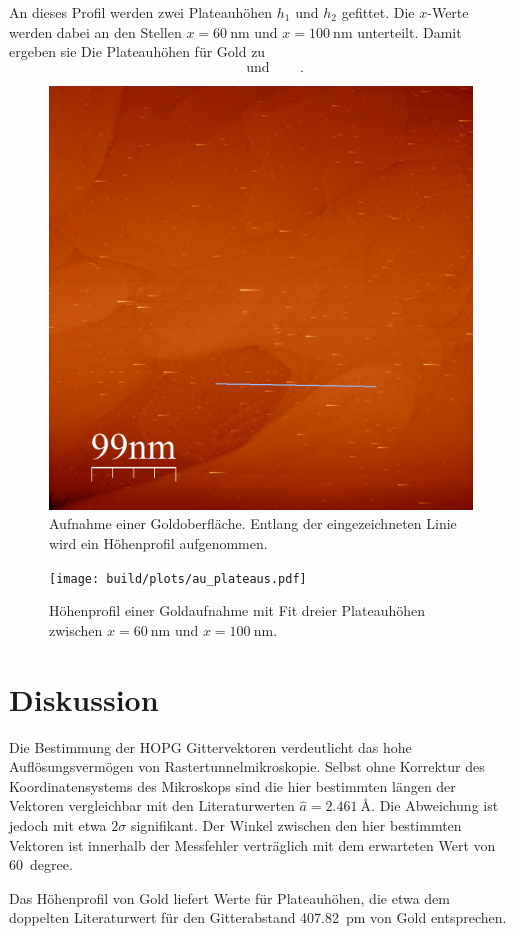 An dieses Profil werden zwei Plateauhöhen $h_1$ und $h_2$ gefittet. Die
$x$-Werte werden dabei an den Stellen $x = \SI{60}{\nano\meter}$ und $x =
\SI{100}{\nano\meter}$ unterteilt.  Damit ergeben sie Die Plateauhöhen für Gold
zu
\begin{equation*}
    \qquad\text{und}\qquad\,.
\end{equation*}
\begin{figure}
    \centering
    \includegraphics[width=0.9\linewidth]{raw/AU-1-View-2.png}
    \caption{
        Aufnahme einer Goldoberfläche. Entlang der eingezeichneten Linie
    wird ein Höhenprofil aufgenommen.
    }
    \label{fig:gold}
\end{figure}
\begin{figure}
    \centering
    \texttt{[image: build/plots/au\_plateaus.pdf]}
    \caption{
        Höhenprofil einer Goldaufnahme mit Fit dreier Plateauhöhen zwischen $x
        = \SI{60}{\nano\meter}$ und $x = \SI{100}{\nano\meter}$.
    }
    \label{fig:gold-fit}
\end{figure}

\section{Diskussion}
\label{sec:diskussion}
Die Bestimmung der HOPG Gittervektoren verdeutlicht das hohe
Auflösungsvermögen von Rastertunnelmikroskopie. Selbst ohne Korrektur des
Koordinatensystems des Mikroskops sind die hier bestimmten längen der Vektoren
vergleichbar mit den Literaturwerten $\hat{a} = \SI{2.461}{\angstrom}$. Die
Abweichung ist jedoch mit etwa $2\sigma$ signifikant. Der Winkel zwischen den
hier bestimmten Vektoren ist innerhalb der
Messfehler verträglich mit dem erwarteten Wert von \SI{60}{degree}.

Das Höhenprofil von Gold liefert Werte für Plateauhöhen, die etwa dem doppelten
Literaturwert für den Gitterabstand \SI{407.82}{\pico\meter} von Gold
entsprechen.
